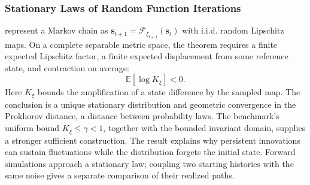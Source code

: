 \subsubsection{Stationary Laws of Random Function Iterations}

\citet[Theorem~1]{diaconis1999iterated} represent a Markov chain as
$\mathbf{s}_{t+1}=\mathcal F_{\xi_{t+1}}(\mathbf{s}_t)$ with i.i.d.
random Lipschitz maps. On a complete separable metric space, the theorem
requires a finite expected Lipschitz factor, a finite expected displacement
from some reference state, and contraction on average:
\begin{equation}
 \mathbb E[\log K_\xi]<0.
\end{equation}
Here $K_\xi$ bounds the amplification of a state difference by the sampled
map. The conclusion is a unique stationary distribution and geometric
convergence in the Prokhorov distance, a distance between probability laws.
The benchmark's uniform bound $K_\xi\leq\gamma<1$, together with the
bounded invariant domain, supplies a stronger sufficient construction.
The result explains why persistent innovations can sustain fluctuations
while the distribution forgets the initial state. Forward simulations
approach a stationary law; coupling two starting histories with the same
noise gives a separate comparison of their realized paths.
